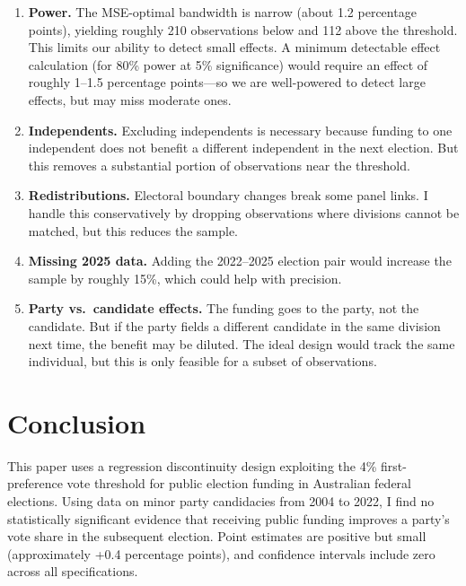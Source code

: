 \documentclass[12pt, a4paper]{article}
\begin{document}
\begin{enumerate}
    \item \textbf{Power.} The MSE-optimal bandwidth is narrow (about 1.2 percentage points), yielding roughly 210 observations below and 112 above the threshold. This limits our ability to detect small effects. A minimum detectable effect calculation (for 80\% power at 5\% significance) would require an effect of roughly 1--1.5 percentage points---so we are well-powered to detect large effects, but may miss moderate ones.

    \item \textbf{Independents.} Excluding independents is necessary because funding to one independent does not benefit a different independent in the next election. But this removes a substantial portion of observations near the threshold.

    \item \textbf{Redistributions.} Electoral boundary changes break some panel links. I handle this conservatively by dropping observations where divisions cannot be matched, but this reduces the sample.

    \item \textbf{Missing 2025 data.} Adding the 2022--2025 election pair would increase the sample by roughly 15\%, which could help with precision.

    \item \textbf{Party vs.\ candidate effects.} The funding goes to the party, not the candidate. But if the party fields a different candidate in the same division next time, the benefit may be diluted. The ideal design would track the same individual, but this is only feasible for a subset of observations.
\end{enumerate}

\section{Conclusion}
\label{sec:conclusion}

This paper uses a regression discontinuity design exploiting the 4\% first-preference vote threshold for public election funding in Australian federal elections. Using data on minor party candidacies from 2004 to 2022, I find no statistically significant evidence that receiving public funding improves a party's vote share in the subsequent election. Point estimates are positive but small (approximately +0.4 percentage points), and confidence intervals include zero across all specifications.
\end{document}
